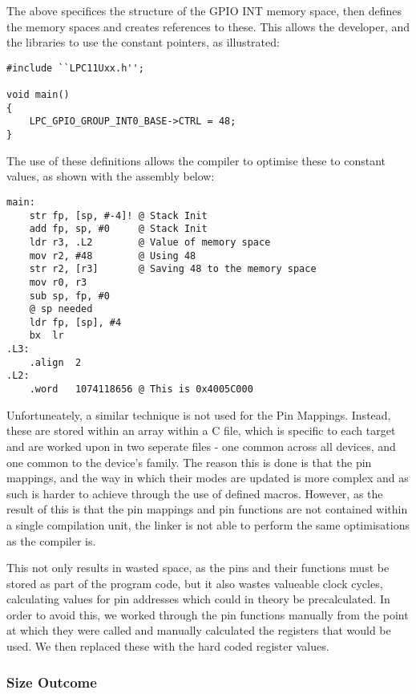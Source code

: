 The above specifices the structure of the GPIO INT memory space, then defines the memory spaces and creates references to these. This allows the developer, and the libraries to use the constant pointers, as illustrated:

\begin{lstlisting}[caption={LPC GPIO GROUP INT0 being used}]
#include ``LPC11Uxx.h'';

void main()
{
    LPC_GPIO_GROUP_INT0_BASE->CTRL = 48;
}
\end{lstlisting}

The use of these definitions allows the compiler to optimise these to constant values, as shown with the assembly below:

\begin{lstlisting}[caption={LPC GPIO GROUP INT0 converted to ASM}]
main:
    str fp, [sp, #-4]! @ Stack Init
    add fp, sp, #0     @ Stack Init
    ldr r3, .L2        @ Value of memory space
    mov r2, #48        @ Using 48
    str r2, [r3]       @ Saving 48 to the memory space
    mov r0, r3
    sub sp, fp, #0
    @ sp needed
    ldr fp, [sp], #4
    bx  lr
.L3:
    .align  2
.L2:
    .word   1074118656 @ This is 0x4005C000
\end{lstlisting}

Unfortuneately, a similar technique is not used for the Pin Mappings. Instead, these are stored within an array within a C file, which is specific to each target and are worked upon in two seperate files - one common across all devices, and one common to the device's family. The reason this is done is that the pin mappings, and the way in which their modes are updated is more complex and as such is harder to achieve through the use of defined macros. However, as the result of this is that the pin mappings and pin functions are not contained within a single compilation unit, the linker is not able to perform the same optimisations as the compiler is.

This not only results in wasted space, as the pins and their functions must be stored as part of the program code, but it also wastes valueable clock cycles, calculating values for pin addresses which could in theory be precalculated. In order to avoid this, we worked through the pin functions manually from the point at which they were called and manually calculated the registers that would be used. We then replaced these with the hard coded register values.

\subsubsection{Size Outcome}

